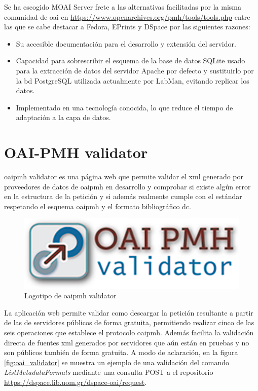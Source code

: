 Se ha escogido MOAI Server frete a las alternativas facilitadas por la misma comunidad de \acrshort{oai} en \url{https://www.openarchives.org/pmh/tools/tools.php} entre las que se cabe destacar a Fedora, EPrints y DSpace por las siguientes razones:

\begin{itemize}
	\item Su accesible documentación para el desarrollo y extensión del servidor.
	\item Capacidad para sobrescribir el esquema de la base de datos SQLite usado para la extracción de datos del servidor Apache por defecto y sustituirlo por la \acrshort{bd} PostgreSQL utilizada actualmente por LabMan, evitando replicar los datos.
	\item Implementado en una tecnología conocida, lo que reduce el tiempo de adaptación a la capa de datos.
\end{itemize}

\section{OAI-PMH validator}

\acrshort{oaipmh} validator\cite{oaipmh_validator} es una página web que permite validar el \acrshort{xml} generado por proveedores de datos de \acrshort{oaipmh} en desarrollo y comprobar si existe algún error en la estructura de la petición y si además realmente cumple con el estándar respetando el esquema \acrshort{oaipmh} y el formato bibliográfico \acrshort{dc}.


\begin{figure}[!htbp]
	\centering
	\includegraphics[scale=0.5]{fig/oaipmh_validator_logo}
	\caption{Logotipo de \acrshort{oaipmh} validator}
\end{figure}

La aplicación web permite validar como descargar la petición resultante a partir de las  de servidores públicos de forma gratuita, permitiendo realizar cinco de las seis operaciones que establece el protocolo \acrshort{oaipmh}. Además facilita la validación directa de fuentes \acrshort{xml} generados por servidores que aún están en pruebas y no son públicos también de forma gratuita. A modo de aclaración, en la figura \ref{fig:oai_validator} se muestra un ejemplo de una validación del comando \textit{ListMetadataFormats} mediante una consulta POST a el repositorio \url{https://dspace.lib.uom.gr/dspace-oai/request}.

